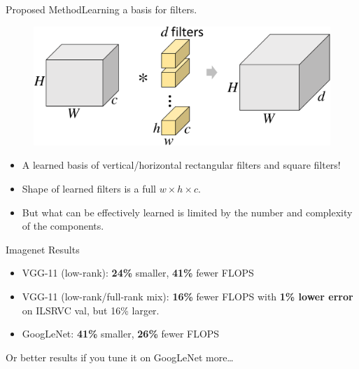 \documentclass[t,xcolor=dvipsnames]{beamer}
\begin{document}
\begin{frame}{Proposed Method}{Learning a basis for filters.}
\begin{figure}
   \includegraphics[width=\textwidth, page=4]{../Figs/PDF/sparsification}
\end{figure}
\begin{itemize}
    \item A learned basis of vertical/horizontal rectangular filters and square filters!
    \item Shape of learned filters is a full $w \times h \times c$.
    \item But what can be effectively learned is limited by the number and complexity of the components.
\end{itemize}
\end{frame}


\begin{frame}{Imagenet Results}

\begin{itemize}
    \item VGG-11 (low-rank): \textbf{24\%} smaller, \textbf{41\%} fewer FLOPS
    \item VGG-11 (low-rank/full-rank mix): \textbf{16\%} fewer FLOPS with \textbf{1\% lower error} on ILSRVC val, but 16\% larger.
    \item GoogLeNet: \textbf{41\%} smaller, \textbf{26\%} fewer FLOPS
\end{itemize}
\vfill
Or better results if you tune it on GoogLeNet more\ldots
\end{frame}
\end{document}
